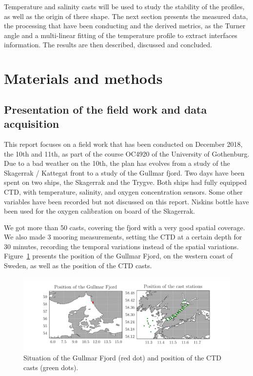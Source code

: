 \documentclass[12pt,a4paper]{article}
\begin{document}
Temperature and salinity casts will be used to study the stability
of the profiles, as well as the origin of there shape.
The next section presents the measured data, the processing
that have been conducting and the derived metrics, as the Turner angle and
a multi-linear fitting of the temperature profile to extract interfaces
information. The results are then described,
discussed and concluded.


\section{Materials and methods}
\subsection{Presentation of the field work and data acquisition}

This report focuses on a field work that has been conducted on December 2018, the
10th and 11th, as part of the course OC4920 of the University of Gothenburg.
Due to a bad weather on the 10th, the plan has evolves from a study of the
Skagerrak / Kattegat front to a study of the Gullmar fjord.
Two days have been spent on two ships, the Skagerrak and the Trygve.
Both ships had fully equipped CTD, with temperature, salinity, and oxygen concentration
sensors. Some other variables have been recorded but not discussed on this
report. Niskins bottle have been used for the oxygen calibration on board of
the Skagerrak.

We got more than 50 casts, covering the fjord with a very good spatial coverage.
We also made 3 mooring measurements, setting the CTD at a certain depth
for 30 minutes, recording the temporal variations instead of the
spatial variations.
Figure~\ref{fig:stations} presents the position of the Gullmar Fjord, on the western
coast of Sweden, as well as the position of the CTD casts.

\begin{figure}
  \centering
  \includegraphics{stations}
  \caption{\label{fig:stations}Situation of the Gullmar Fjord (red dot) and position
    of the CTD casts (green dots).}
\end{figure}
\end{document}
